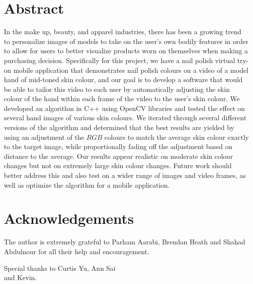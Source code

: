 \documentclass[12pt, a4paper]{article}
\begin{document}


\renewcommand{\thepage}{\roman{page}}%
\setcounter{page}{1}

\section*{Abstract}
In the make up, beauty, and apparel industries, there has been a growing trend to personalize images of models to take on the user's own bodily features in order to allow for users to better visualize products worn on themselves when making a purchasing decision. Specifically for this project, we have a nail polish virtual try-on mobile application that demonstrates nail polish colours on a video of a model hand of mid-toned skin colour, and our goal is to develop a software that would be able to tailor this video to each user by automatically adjusting the skin colour of the hand within each frame of the video to the user's skin colour. We developed an algorithm in C++ using OpenCV libraries and tested the effect on several hand images of various skin colours. We iterated through several different versions of the algorithm and determined that the best results are yielded by using an adjustment of the $RGB$ colours to match the average skin colour exactly to the target image, while proportionally fading off the adjustment based on distance to the average. Our results appear realistic on moderate skin colour changes but not on extremely large skin colour changes. Future work should better address this and also test on a wider range of images and video frames, as well as optimize the algorithm for a mobile application.

\pagebreak

\section*{Acknowledgements}
The author is extremely grateful to Parham Aarabi, Brendan Heath and Shahad Abdulnour for all their help and encouragement.

Special thanks to Curtis Yu, Ann Sai\\
and Kevin.
\pagebreak

\tableofcontents
\pagebreak

\listoffigures
\listoftables
\pagebreak

\renewcommand{\nomname}{List of Symbols}
\printnomenclature
\pagebreak

\renewcommand{\thepage}{\arabic{page}}%
\setcounter{page}{1}
\end{document}
